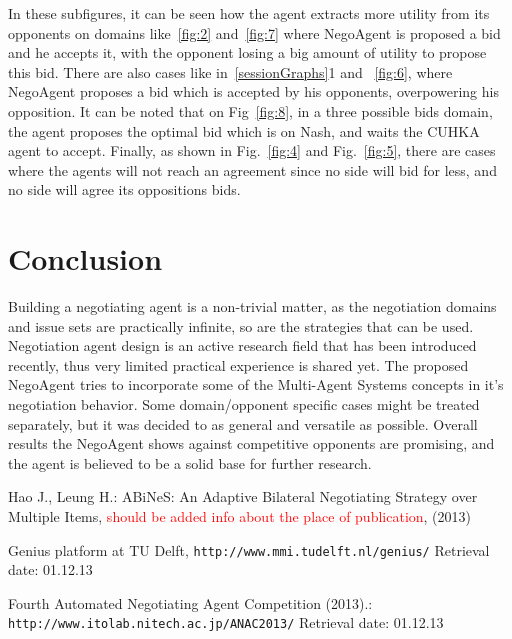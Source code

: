 \documentclass[html]{report}    %
\begin{document}
In these subfigures, it can be seen how the agent extracts more utility from its opponents on domains like~\ref{fig:2} and~\ref{fig:7} where NegoAgent is proposed a bid and he accepts it, with the opponent losing a big amount of utility to propose this bid. There are also cases like in~\ref{sessionGraphs}{1} and ~\ref{fig:6}, where NegoAgent proposes a bid which is accepted by his opponents, overpowering his opposition. It can be noted that on Fig~\ref{fig:8}, in a three possible bids domain, the agent proposes the optimal bid which is on Nash, and waits the CUHKA agent to accept. Finally, as shown in Fig.~\ref{fig:4} and Fig.~\ref{fig:5}, there are cases where the agents will not reach an agreement since no side will bid for less, and no side will agree its oppositions bids.


\section{Conclusion}
Building a negotiating agent is a non-trivial matter, as the negotiation domains and issue sets are practically infinite, so are the strategies that can be used. Negotiation agent design is an active research field that has been introduced recently, thus very limited practical experience is shared yet. The proposed NegoAgent tries to incorporate some of the Multi-Agent Systems concepts in it's negotiation behavior. Some domain/opponent specific cases might be treated separately, but it was decided to as general and versatile as possible. Overall results the NegoAgent shows against competitive opponents are promising, and the agent is believed to be a solid base for further research. 

\begin{thebibliography}{}

Hao J., Leung H.:
ABiNeS: An Adaptive Bilateral Negotiating Strategy over Multiple Items,
\textcolor{red}{should be added info about the place of publication}, (2013)

Genius platform at TU Delft,
\texttt{http://www.mmi.tudelft.nl/genius/} Retrieval date: 01.12.13

Fourth Automated Negotiating Agent Competition (2013).:
\texttt{http://www.itolab.nitech.ac.jp/ANAC2013/} Retrieval date: 01.12.13

\end{thebibliography}
\end{document}
